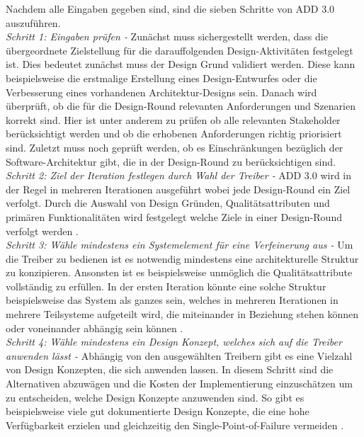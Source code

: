 Nachdem alle Eingaben gegeben sind, sind die sieben Schritte von ADD 3.0 auszuf\"uhren.\\

\emph{Schritt 1: Eingaben pr\"ufen -}
Zun\"achst muss sichergestellt werden, dass die \"ubergeordnete Zielstellung f\"ur die darauffolgenden Design-Aktivit\"aten festgelegt ist. Dies bedeutet zun\"achst muss der Design Grund validiert werden. Diese kann beispielsweise die erstmalige Erstellung eines Design-Entwurfes oder die Verbesserung eines vorhandenen Architektur-Designs sein. Danach wird \"uberpr\"uft, ob die f\"ur die Design-Round relevanten Anforderungen und Szenarien korrekt sind. Hier ist unter anderem zu pr\"ufen ob alle relevanten Stakeholder ber\"ucksichtigt werden und ob die erhobenen Anforderungen richtig priorisiert sind. Zuletzt muss noch gepr\"uft werden, ob es Einschr\"ankungen bez\"uglich der Software-Architektur gibt, die in der Design-Round zu ber\"ucksichtigen sind.\\

\emph{Schritt 2: Ziel der Iteration festlegen durch Wahl der Treiber -}
ADD 3.0 wird in der Regel in mehreren Iterationen ausgef\"uhrt wobei jede Design-Round ein Ziel verfolgt. Durch die Auswahl von Design Gr\"unden, Qualit\"atsattributen und prim\"aren Funktionalit\"aten wird festgelegt welche Ziele in einer Design-Round verfolgt werden \cite{Cer01}.\\

\emph{Schritt 3: W\"ahle mindestens ein Systemelement f\"ur eine Verfeinerung aus -}
Um die Treiber zu bedienen ist es notwendig mindestens eine architekturelle Struktur zu konzipieren. Ansonsten ist es beispielsweise unm\"oglich die Qualit\"atsattribute vollst\"andig zu erf\"ullen. In der ersten Iteration k\"onnte eine solche Struktur beispielsweise das System als ganzes sein, welches in mehreren Iterationen in mehrere Teilsysteme aufgeteilt wird, die miteinander in Beziehung stehen k\"onnen oder voneinander abh\"angig sein k\"onnen \cite{Cer01}.\\

\emph{Schritt 4: W\"ahle mindestens ein Design Konzept, welches sich auf die Treiber anwenden l\"asst -}
Abh\"angig von den ausgew\"ahlten Treibern gibt es eine Vielzahl von Design Konzepten, die sich anwenden lassen. In diesem Schritt sind die Alternativen abzuw\"agen und die Kosten der Implementierung einzusch\"atzen um zu entscheiden, welche Design Konzepte anzuwenden sind. So gibt es beispielsweise viele gut dokumentierte Design Konzepte, die eine hohe Verf\"ugbarkeit erzielen und gleichzeitig den Single-Point-of-Failure vermeiden \cite{Cer01}.\\

